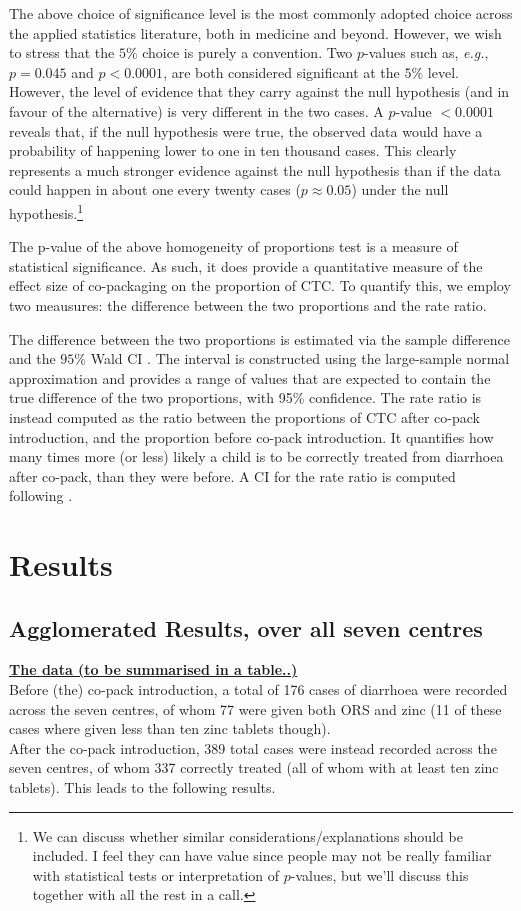 \documentclass[a4paper, 12pt]{article}
\newcommand{\eg}{\textit{e.g.}}
\begin{document}
The above choice of significance level is the most commonly adopted choice across the applied statistics literature, both in medicine and beyond. However, we wish to stress that the $5\%$ choice is purely a convention. Two $p$-values such as, \eg, $p=0.045$ and $p<0.0001$, are both considered significant at the $5\%$ level. 
However, the level of evidence that they carry against the null hypothesis (and in favour of the alternative) is very different in the two cases. A $p$-value $<0.0001$ reveals that, if the null hypothesis were true, the observed data would have a probability of happening lower to one in ten thousand cases. This clearly represents a much stronger evidence against the null hypothesis than if the data could happen in about one every twenty cases ($p\approx 0.05$) under the null hypothesis.\footnote{We can discuss whether similar considerations/explanations should be included. I feel they can have value since people may not be really familiar with statistical tests or interpretation of $p$-values, but we'll discuss this together with all the rest in a call.}

The p-value of the above homogeneity of proportions test is a measure of statistical significance. As such, it does provide a quantitative measure of the effect size of co-packaging on the proportion of CTC. To quantify this, we employ two meausures: the difference between the two proportions and the rate ratio.

The difference between the two proportions is estimated via the sample difference and the $95\%$ Wald CI \cite{agresti2002}. The interval is constructed using the large-sample normal approximation and provides a range of values that are expected to contain the true difference of the two proportions, with 95\% confidence. 
The rate ratio is instead computed as the ratio between the proportions of CTC after co-pack introduction, and the proportion before co-pack introduction. It quantifies how many times more (or less) likely a child is to be correctly treated from diarrhoea after co-pack, than they were before. A CI for the rate ratio is computed following \cite{agresti2002, nam1995}.





\section{Results}
\subsection{Agglomerated Results, over all seven centres}
{\bf \underline{The data (to be summarised in a table..)}}\\
Before (the) co-pack introduction, a total of 176 cases of diarrhoea were recorded across the seven centres, of whom 77 were given both ORS and zinc (11 of these cases where given less than ten zinc tablets though).
\\
After the co-pack introduction, 389 total cases were instead recorded across the seven centres, of whom 337 correctly treated (all of whom with at least ten zinc tablets). This leads to the following results.
\end{document}
